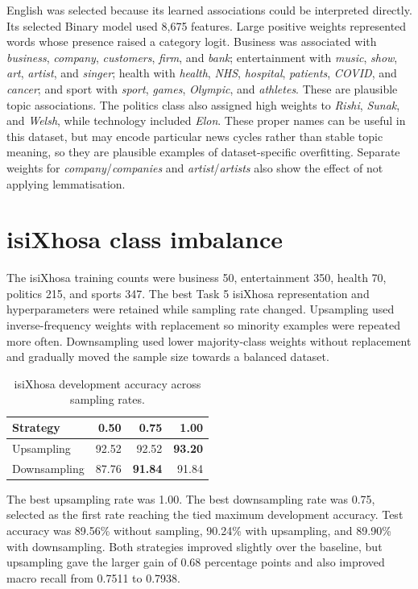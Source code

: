 \documentclass[10pt,a4paper]{article}
\begin{document}
English was selected because its learned associations could be interpreted directly. Its selected Binary model used 8,675 features. Large positive weights represented words whose presence raised a category logit. Business was associated with \emph{business}, \emph{company}, \emph{customers}, \emph{firm}, and \emph{bank}; entertainment with \emph{music}, \emph{show}, \emph{art}, \emph{artist}, and \emph{singer}; health with \emph{health}, \emph{NHS}, \emph{hospital}, \emph{patients}, \emph{COVID}, and \emph{cancer}; and sport with \emph{sport}, \emph{games}, \emph{Olympic}, and \emph{athletes}. These are plausible topic associations. The politics class also assigned high weights to \emph{Rishi}, \emph{Sunak}, and \emph{Welsh}, while technology included \emph{Elon}. These proper names can be useful in this dataset, but may encode particular news cycles rather than stable topic meaning, so they are plausible examples of dataset-specific overfitting. Separate weights for \emph{company}/\emph{companies} and \emph{artist}/\emph{artists} also show the effect of not applying lemmatisation.

\section{isiXhosa class imbalance}

The isiXhosa training counts were business 50, entertainment 350, health 70, politics 215, and sports 347. The best Task 5 isiXhosa representation and hyperparameters were retained while sampling rate changed. Upsampling used inverse-frequency weights with replacement so minority examples were repeated more often. Downsampling used lower majority-class weights without replacement and gradually moved the sample size towards a balanced dataset.

\begin{table}[htbp]
\centering
\small
\caption{isiXhosa development accuracy across sampling rates.}
\begin{tabular}{lrrr}
\toprule
Strategy & 0.50 & 0.75 & 1.00\\
\midrule
Upsampling & 92.52 & 92.52 & \textbf{93.20}\\
Downsampling & 87.76 & \textbf{91.84} & 91.84\\
\bottomrule
\end{tabular}
\end{table}

The best upsampling rate was 1.00. The best downsampling rate was 0.75, selected as the first rate reaching the tied maximum development accuracy. Test accuracy was 89.56\% without sampling, 90.24\% with upsampling, and 89.90\% with downsampling. Both strategies improved slightly over the baseline, but upsampling gave the larger gain of 0.68 percentage points and also improved macro recall from 0.7511 to 0.7938.
\end{document}
